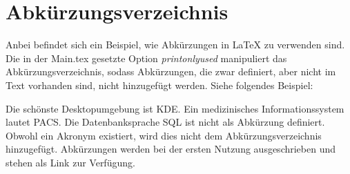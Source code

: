 \chapter*{Abkürzungsverzeichnis}


\begin{acronym}[PACS]
\end{acronym}


Anbei befindet sich ein Beispiel, wie Abkürzungen in {\LaTeX} zu verwenden sind. Die in der Main.tex gesetzte Option \textit{printonlyused} manipuliert das Abkürzungsverzeichnis, sodass Abkürzungen, die zwar definiert, aber nicht im Text vorhanden sind, nicht hinzugefügt werden. Siehe folgendes Beispiel:

Die schönste Desktopumgebung ist \ac{KDE}. Ein medizinisches Informationssystem lautet \ac{PACS}. Die Datenbanksprache SQL ist nicht als Abkürzung definiert. Obwohl ein Akronym existiert, wird dies nicht dem Abkürzungsverzeichnis hinzugefügt. Abkürzungen werden bei der ersten Nutzung ausgeschrieben und stehen als Link zur Verfügung.